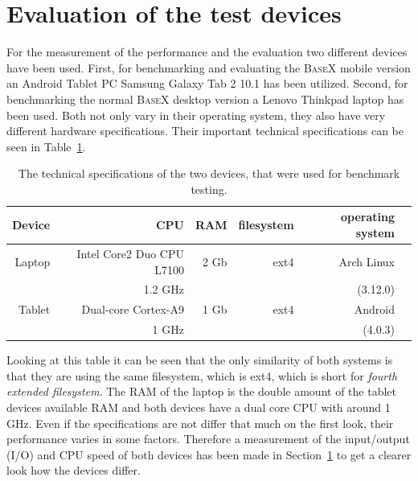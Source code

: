 \section{Evaluation of the test devices}
\label{sec:evaluation-of-the-test-devices}
For the measurement of the performance and the evaluation two different devices have been used.
First, for benchmarking and evaluating the \textsc{BaseX} mobile version an Android Tablet PC Samsung Galaxy Tab 2 10.1 has been utilized.
Second, for benchmarking the normal \textsc{BaseX} desktop version a Lenovo Thinkpad laptop has been used.
Both not only vary in their operating system, they also have very different hardware specifications.
Their important technical specifications can be seen in Table~\ref{tab:test-dev-specs}.
\begin {table}[htpb] 
  \centering
\begin {tabular} {|r|r|r|r|r|r|}
  	\hline
	Device&CPU&RAM&filesystem&operating system\\
	\hline
	Laptop&Intel Core2 Duo CPU L7100&2 Gb&ext4&Arch Linux\\
	&1.2 GHz&&&(3.12.0)\\
	\hline
	Tablet&Dual-core Cortex-A9&1 Gb&ext4&Android\\
	&1 GHz&&&(4.0.3)\\
	\hline
\end {tabular}
\caption {The technical specifications of the two devices, that were used for benchmark testing.}
\label {tab:test-dev-specs}
\end {table}
\newpage
Looking at this table it can be seen that the only similarity of both systems is that they are using the same filesystem, which is ext4, which is short for \textit{fourth extended filesystem}.
The RAM of the laptop is the double amount of the tablet devices available RAM and both devices have a dual core CPU with around 1 GHz.
Even if the specifications are not differ that much on the first look, their performance varies in some factors.
Therefore a measurement of the input/output (I/O) and CPU speed of both devices has been made in Section~\ref{sec:evaluation-of-the-test-devices} to get a clearer look how the devices differ.



